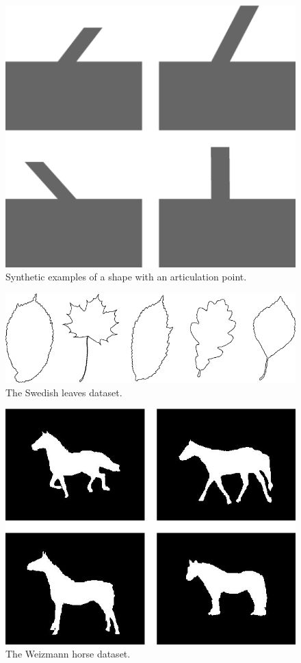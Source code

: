 

\begin{figure}
  \centering
\includegraphics[width=120mm]{images/articulator.png}
\caption{Synthetic examples of a shape with an articulation point.}
\label{fig-articulator}
\end{figure}

\begin{figure}
  \centering
\includegraphics[width=120mm]{images/leaves.png}
\caption{The Swedish leaves dataset.}
\label{fig-leaves}
\end{figure}

\begin{figure}
  \centering
\includegraphics[width=120mm]{images/horse.png}
\caption{The Weizmann horse dataset.}
\label{fig-horse}
\end{figure}

